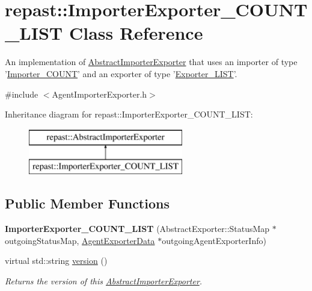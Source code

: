 \hypertarget{classrepast_1_1_importer_exporter___c_o_u_n_t___l_i_s_t}{\section{repast\-:\-:Importer\-Exporter\-\_\-\-C\-O\-U\-N\-T\-\_\-\-L\-I\-S\-T Class Reference}
\label{classrepast_1_1_importer_exporter___c_o_u_n_t___l_i_s_t}
}


An implementation of \hyperlink{classrepast_1_1_abstract_importer_exporter}{Abstract\-Importer\-Exporter} that uses an importer of type '\hyperlink{classrepast_1_1_importer___c_o_u_n_t}{Importer\-\_\-\-C\-O\-U\-N\-T}' and an exporter of type '\hyperlink{classrepast_1_1_exporter___l_i_s_t}{Exporter\-\_\-\-L\-I\-S\-T}'.  




{\ttfamily \#include $<$Agent\-Importer\-Exporter.\-h$>$}

Inheritance diagram for repast\-:\-:Importer\-Exporter\-\_\-\-C\-O\-U\-N\-T\-\_\-\-L\-I\-S\-T\-:\begin{figure}[H]
\begin{center}
\leavevmode
\includegraphics[height=2.000000cm]{classrepast_1_1_importer_exporter___c_o_u_n_t___l_i_s_t}
\end{center}
\end{figure}
\subsection*{Public Member Functions}
\begin{DoxyCompactItemize}
\item 
\hypertarget{classrepast_1_1_importer_exporter___c_o_u_n_t___l_i_s_t_acd154e0d330e2313430184323f384576}{{\bfseries Importer\-Exporter\-\_\-\-C\-O\-U\-N\-T\-\_\-\-L\-I\-S\-T} (Abstract\-Exporter\-::\-Status\-Map $\ast$outgoing\-Status\-Map, \hyperlink{classrepast_1_1_agent_exporter_data}{Agent\-Exporter\-Data} $\ast$outgoing\-Agent\-Exporter\-Info)}\label{classrepast_1_1_importer_exporter___c_o_u_n_t___l_i_s_t_acd154e0d330e2313430184323f384576}

\item 
virtual std\-::string \hyperlink{classrepast_1_1_importer_exporter___c_o_u_n_t___l_i_s_t_a576d3dc96aa00bab8a4f0bbe6e64981c}{version} ()
\begin{DoxyCompactList}\small\item\em Returns the version of this \hyperlink{classrepast_1_1_abstract_importer_exporter}{Abstract\-Importer\-Exporter}. \end{DoxyCompactList}\end{DoxyCompactItemize}
